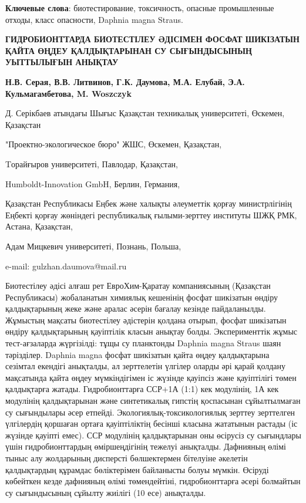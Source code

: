 {\bfseries Ключевые слова}: биотестирование, токсичность, опасные
промышленные отходы, класс опасности, Daphnia magna Straus.

\begin{header}
{\bfseries ГИДРОБИОНТТАРДА БИОТЕСТІЛЕУ ӘДІСІМЕН ФОСФАТ ШИКІЗАТЫН ҚАЙТА ӨҢДЕУ ҚАЛДЫҚТАРЫНАН СУ СЫҒЫНДЫСЫНЫҢ УЫТТЫЛЫҒЫН АНЫҚТАУ}

{\bfseries
{}Н.В. Серая,
В.В. Литвинов,
Г.К. Даумова\envelope,
М.А. Елубай,
Э.А. Кульмагамбетова,
M. Woszczyk
}
\end{header}

\begin{affil}
Д. Серікбаев атындағы Шығыс Қазақстан техникалық университеті, Өскемен, Қазақстан

"Проектно-экологическое бюро" ЖШС, Өскемен, Қазақстан,

Tорайғыров университеті, Павлодар, Қазақстан,

Humboldt-Innovation GmbH, Берлин, Германия,

Қазақстан Республикасы Еңбек және халықты әлеуметтік қорғау министрлігінің Еңбекті қорғау жөніндегі республикалық ғылыми-зерттеу институты ШЖҚ РМК, Астана, Қазақстан,

Адам Мицкевич университеті, Познань, Польша,

e-mail: gulzhan.daumova@mail.ru
\end{affil}

Биотестілеу әдісі алғаш рет ЕвроХим-Қаратау компаниясының (Қазақстан
Республикасы) жобаланатын химиялық кешенінің фосфат шикізатын өндіру
қалдықтарының жеке және аралас әсерін бағалау кезінде пайдаланылды.
Жұмыстың мақсаты биотестілеу әдістерін қолдана отырып, фосфат шикізатын
өндіру қалдықтарының қауіптілік класын анықтау болды. Эксперименттік
жұмыс тест-ағзаларда жүргізілді: тұщы су планктонды Daphnia magna Straus
шаян тәрізділер. Daphnia magna фосфат шикізатын қайта өңдеу қалдықтарына
сезімтал екендігі анықталды, ал зерттелетін үлгілер оларды әрі қарай
қолдану мақсатында қайта өңдеу мүмкіндігімен іс жүзінде қауіпсіз және
қауіптілігі төмен қалдықтарға жатады. Гидробионттарға ССР+1А (1:1) кек
модулінің, 1А кек модулінің қалдықтарынан және синтетикалық гипстің
қоспасынан сұйылтылмаған су сығындылары әсер етпейді.
Экологиялық-токсикологиялық зерттеу зерттелген үлгілердің қоршаған
ортаға қауіптіліктің бесінші класына жататынын растады (іс жүзінде
қауіпті емес). ССР модулінің қалдықтарынан оны өсірусіз су сығындлары
үшін гидробионттардың өміршеңдігінің тежелуі анықталды. Дафнияның өлімі
тыныс алу жолдарының дисперсті бөлшектермен бітелуіне әкелетін
қалдықтардың құрамдас бөліктерімен байланысты болуы мүмкін. Өсіруді
көбейткен кезде дафнияның өлімі төмендейтіні, гидробионттарға әсері
болмайтын су сығындысының сұйылту жиілігі (10 есе) анықталды.

